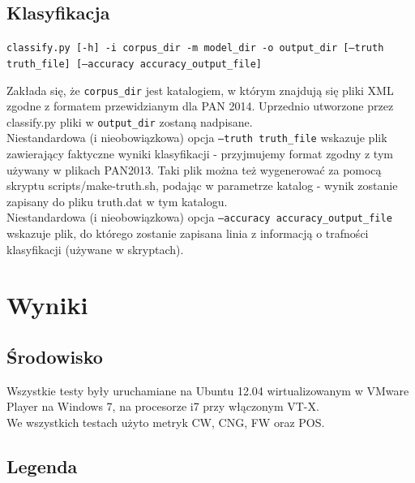 \documentclass{article}
\begin{document}
\subsection{Klasyfikacja}

\texttt{classify.py [-h] -i corpus\_dir -m model\_dir -o output\_dir  [--truth truth\_file] [--accuracy accuracy\_output\_file]}

Zakłada się, że \texttt{corpus\_dir} jest katalogiem, w którym znajdują się pliki XML zgodne z formatem przewidzianym dla PAN 2014. Uprzednio utworzone przez classify.py pliki w \texttt{output\_dir} zostaną nadpisane. \\
Niestandardowa (i nieobowiązkowa) opcja \texttt{--truth truth\_file} wskazuje plik zawierający faktyczne wyniki klasyfikacji - przyjmujemy format zgodny z tym używany w plikach PAN2013. Taki plik można też wygenerować za pomocą skryptu scripts/make-truth.sh, podając w parametrze katalog - wynik zostanie zapisany do pliku truth.dat w tym katalogu.\\
Niestandardowa (i nieobowiązkowa) opcja \texttt{--accuracy accuracy\_output\_file} wskazuje plik, do którego zostanie zapisana linia z informacją o trafności klasyfikacji (używane w skryptach).


\section{Wyniki}

\subsection{Środowisko}

Wszystkie testy były uruchamiane na Ubuntu 12.04 wirtualizowanym w VMware Player na Windows 7, na procesorze i7 przy włączonym VT-X. \\

We wszystkich testach użyto metryk CW, CNG, FW oraz POS. \\

\subsection{Legenda}
\end{document}
